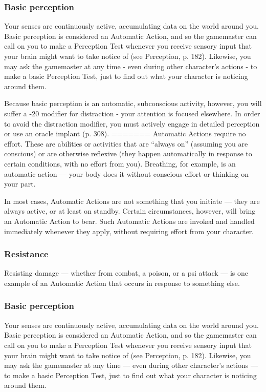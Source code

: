 \subsubsection{Basic perception} 

Your senses are continuously active, accumulating data on the world around you. Basic perception is considered an Automatic Action, and so the gamemaster can call on you to make a Perception Test whenever you receive sensory input that your brain might want to take notice of (see Perception, p. 182). Likewise, you may ask the gamemaster at any time - even during other character’s actions - to make a basic Perception Test, just to find out what your character is noticing around them. 

Because basic perception is an automatic, subconscious activity, however, you will suffer a -20 modifier for distraction - your attention is focused elsewhere. In order to avoid the distraction modifier, you must actively engage in detailed perception or use an oracle implant (p. 308). ======= Automatic Actions require no effort. These are abilities or activities that are ``always on'' (assuming you are conscious) or are otherwise reflexive (they happen automatically in response to certain conditions, with no effort from you). Breathing, for example, is an automatic action --- your body does it without conscious effort or thinking on your part. 

In most cases, Automatic Actions are not something that you initiate --- they are always active, or at least on standby. Certain circumstances, however, will bring an Automatic Action to bear. Such Automatic Actions are invoked and handled immediately whenever they apply, without requiring effort from your character. 

\subsubsection{Resistance} 

Resisting damage --- whether from combat, a poison, or a psi attack --- is one example of an Automatic Action that occurs in response to something else. 

\subsubsection{Basic perception} 

Your senses are continuously active, accumulating data on the world around you. Basic perception is considered an Automatic Action, and so the gamemaster can call on you to make a Perception Test whenever you receive sensory input that your brain might want to take notice of (see Perception, p. 182). Likewise, you may ask the gamemaster at any time --- even during other character’s actions --- to make a basic Perception Test, just to find out what your character is noticing around them. 

